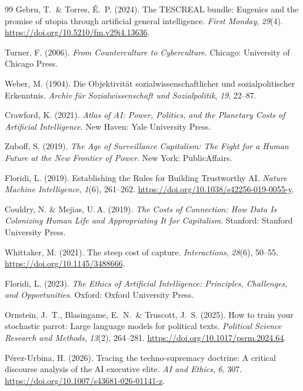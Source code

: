 \documentclass[12pt,a4paper]{article}
\begin{document}
\begin{thebibliography}{99}
  Gebru, T.~\& Torres, É.~P. (2024).
  The TESCREAL bundle: Eugenics and the promise of utopia through artificial general intelligence.
  \textit{First Monday}, \textit{29}(4).
  \url{https://doi.org/10.5210/fm.v29i4.13636}.

  Turner, F. (2006).
  \textit{From Counterculture to Cyberculture}.
  Chicago: University of Chicago Press.

  Weber, M. (1904).
  Die \glqq Objektivität\grqq{} sozialwissenschaftlicher und sozialpolitischer Erkenntnis.
  \textit{Archiv für Sozialwissenschaft und Sozialpolitik}, \textit{19}, 22--87.

  Crawford, K. (2021).
  \textit{Atlas of AI: Power, Politics, and the Planetary Costs of Artificial Intelligence}.
  New Haven: Yale University Press.

  Zuboff, S. (2019).
  \textit{The Age of Surveillance Capitalism: The Fight for a Human Future at the New Frontier of Power}.
  New York: PublicAffairs.

  Floridi, L. (2019).
  Establishing the Rules for Building Trustworthy AI.
  \textit{Nature Machine Intelligence}, \textit{1}(6), 261--262.
  \url{https://doi.org/10.1038/s42256-019-0055-y}.

  Couldry, N. \& Mejias, U.\,A. (2019).
  \textit{The Costs of Connection: How Data Is Colonizing Human Life and Appropriating It for Capitalism}.
  Stanford: Stanford University Press.

  Whittaker, M. (2021).
  The steep cost of capture.
  \textit{Interactions}, \textit{28}(6), 50--55.
  \url{https://doi.org/10.1145/3488666}.

  Floridi, L. (2023).
  \textit{The Ethics of Artificial Intelligence: Principles, Challenges, and Opportunities}.
  Oxford: Oxford University Press.

  Ornstein, J.~T., Blasingame, E.~N.~\& Truscott, J.~S. (2025).
  How to train your stochastic parrot: Large language models for political texts.
  \textit{Political Science Research and Methods}, \textit{13}(2), 264--281.
  \url{https://doi.org/10.1017/psrm.2024.64}.

  Pérez-Urbina, H. (2026).
  Tracing the techno-supremacy doctrine: A critical discourse analysis of the AI executive elite.
  \textit{AI and Ethics}, \textit{6}, 307.
  \url{https://doi.org/10.1007/s43681-026-01141-z}.


\end{thebibliography}
\end{document}
